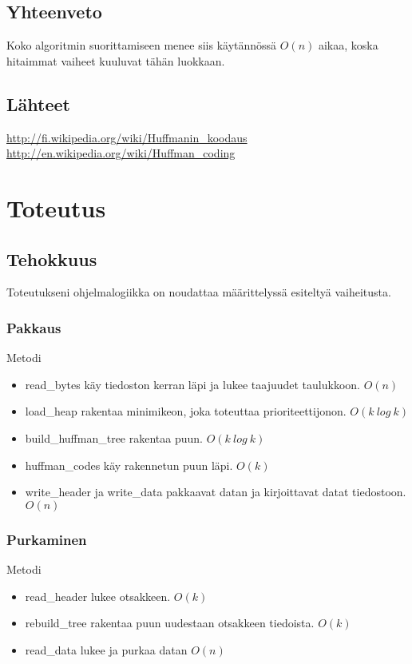 \documentclass[a4paper, 12pt, finnish]{article}
\begin{document}
\subsection{Yhteenveto}
Koko algoritmin suorittamiseen menee siis käytännössä $O(n)$ aikaa, koska hitaimmat vaiheet kuuluvat tähän luokkaan.

\subsection{Lähteet}
\url{http://fi.wikipedia.org/wiki/Huffmanin_koodaus}
\\
\url{http://en.wikipedia.org/wiki/Huffman_coding}


\section{Toteutus}
\subsection{Tehokkuus}
Toteutukseni ohjelmalogiikka on noudattaa määrittelyssä esiteltyä vaiheitusta.
\subsubsection{Pakkaus}
Metodi
\begin{itemize}
\item read\_bytes käy tiedoston kerran läpi ja lukee taajuudet taulukkoon. $O(n)$
\item load\_heap rakentaa minimikeon, joka toteuttaa prioriteettijonon. $O(k~log~k)$
\item build\_huffman\_tree rakentaa puun. $O(k~log~k)$
\item huffman\_codes käy rakennetun puun läpi. $O(k)$
\item write\_header ja write\_data pakkaavat datan ja kirjoittavat datat tiedostoon. $O(n)$
\end{itemize}
\subsubsection{Purkaminen}
Metodi
\begin{itemize}
\item read\_header lukee otsakkeen. $O(k)$
\item rebuild\_tree rakentaa puun uudestaan otsakkeen tiedoista. $O(k)$
\item read\_data lukee ja purkaa datan $O(n)$
\end{itemize}
\end{document}
